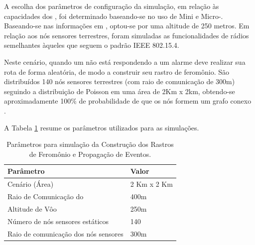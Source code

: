 A escolha dos parâmetros de configuração da simulação, em relação às capacidades dos \vants, foi determinado baseando-se no uso de Mini e Micro-\vants. Baseando-se nas informações em \cite{uas_2009,Storvold2009}, optou-se por uma altitude de 250 metros. Em relação aos nós sensores terrestres, foram simuladas as funcionalidades de rádios semelhantes àqueles que seguem o padrão IEEE 802.15.4.

Neste cenário, quando um \vant não está respondendo a um alarme deve realizar sua rota de forma aleatória, de modo a construir seu rastro de feromônio. São distribuídos 140 nós sensores terrestres (com raio de comunicação de 300m) seguindo a distribuição de Poisson em uma área de 2Km x 2km, obtendo-se aproximadamente 100\% de probabilidade de que os nós formem um grafo conexo \cite{Bettstetter2002}.

A Tabela \ref{tbl:setup} resume os parâmetros utilizados para as simulações.

\begin{table}[h!]
\centering
	\begin{tabular}{| l | l |}
		\hline
		Parâmetro & Valor \\
		\hline
		Cenário (Área)  & 2 Km x 2 Km\\
		Raio de Comunicação do \vant & 400m\\
		Altitude de Vôo & 250m  \\
		Número de nós sensores estáticos & 140  \\
		Raio de comunicação dos nós sensores & 300m \\
		\hline
	\end{tabular}

	\caption{Parâmetros para simulação da Construção dos Rastros de Feromônio e Propagação de Eventos.}
	\label{tbl:setup}
\end{table}

